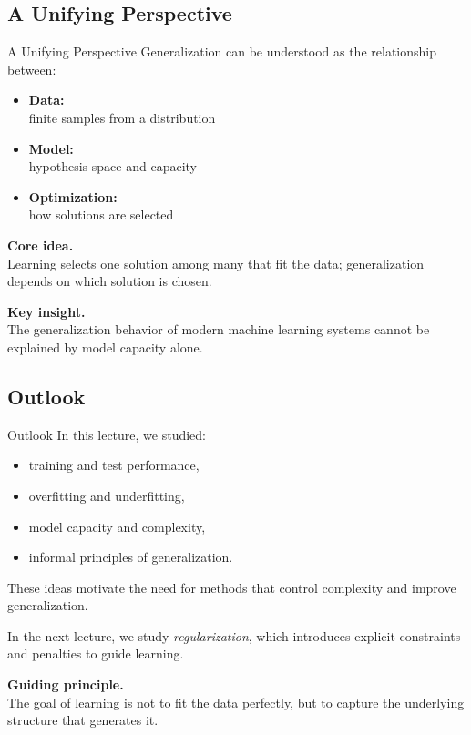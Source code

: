 \documentclass[aspectratio=169,11pt]{beamer}
\begin{document}
\subsection{A Unifying Perspective}
\begin{frame}[t,allowframebreaks]{A Unifying Perspective}
\small
Generalization can be understood as the relationship between:

\begin{itemize}
    \item \textbf{Data:}\\ finite samples from a distribution
    \item \textbf{Model:}\\ hypothesis space and capacity
    \item \textbf{Optimization:}\\ how solutions are selected
\end{itemize}

\textbf{Core idea.}\\ Learning selects one solution among many that fit the data; generalization depends on which solution is chosen.

\textbf{Key insight.}\\ The generalization behavior of modern machine learning systems cannot be explained by model capacity alone.
\end{frame}

\subsection{Outlook}
\begin{frame}[t,allowframebreaks]{Outlook}
\small
In this lecture, we studied:

\begin{itemize}
    \item training and test performance,
    \item overfitting and underfitting,
    \item model capacity and complexity,
    \item informal principles of generalization.
\end{itemize}

These ideas motivate the need for methods that control complexity and improve generalization.

In the next lecture, we study \emph{regularization}, which introduces explicit constraints and penalties to guide learning.

\textbf{Guiding principle.}\\ The goal of learning is not to fit the data perfectly, but to capture the underlying structure that generates it.
\end{frame}
\end{document}
